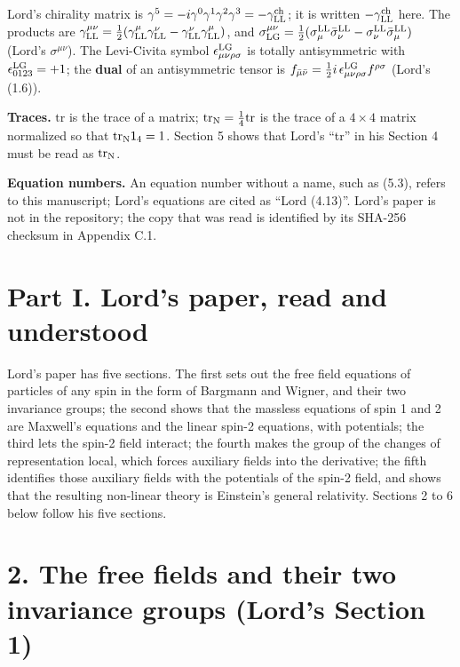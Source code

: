 \documentclass[
  10pt,
]{article}
\begin{document}
Lord's chirality matrix is
\(\gamma^5=-i\gamma^0\gamma^1\gamma^2\gamma^3=-\gamma^{\rm ch}_{\rm LL}\);
it is written \(-\gamma^{\rm ch}_{\rm LL}\) here. The products are
\(\gamma^{\mu\nu}_{\rm LL}=\tfrac12(\gamma^\mu_{\rm LL}\gamma^\nu_{\rm LL}-\gamma^\nu_{\rm LL}\gamma^\mu_{\rm LL})\),
and
\(\sigma^{\mu\nu}_{\rm LG}=\tfrac12(\sigma^{\rm LL}_\mu\bar\sigma^{\rm LL}_\nu-\sigma^{\rm LL}_\nu\bar\sigma^{\rm LL}_\mu)\)
(Lord's \(\sigma^{\mu\nu}\)). The Levi-Civita symbol
\(\epsilon^{\rm LG}_{\mu\nu\rho\sigma}\) is totally antisymmetric with
\(\epsilon^{\rm LG}_{0123}=+1\); the \textbf{dual} of an antisymmetric
tensor is
\(f_{\bar\mu\bar\nu}=\tfrac12i\,\epsilon^{\rm LG}_{\mu\nu\rho\sigma}f^{\rho\sigma}\)
(Lord's (1.6)).

\textbf{Traces.} \(\mathrm{tr}\) is the trace of a matrix;
\(\mathrm{tr}_{\rm N}=\tfrac14\mathrm{tr}\) is the trace of a
\(4\times4\) matrix normalized so that
\(\mathrm{tr}_{\rm N}\mathsf 1_4=1\). Section 5 shows that Lord's ``tr''
in his Section 4 must be read as \(\mathrm{tr}_{\rm N}\).

\textbf{Equation numbers.} An equation number without a name, such as
(5.3), refers to this manuscript; Lord's equations are cited as ``Lord
(4.13)''. Lord's paper is not in the repository; the copy that was read
is identified by its SHA-256 checksum in Appendix C.1.

\hypertarget{part-i.-lords-paper-read-and-understood}{%
\section{Part I. Lord's paper, read and
understood}\label{part-i.-lords-paper-read-and-understood}}

Lord's paper has five sections. The first sets out the free field
equations of particles of any spin in the form of Bargmann and Wigner,
and their two invariance groups; the second shows that the massless
equations of spin 1 and 2 are Maxwell's equations and the linear spin-2
equations, with potentials; the third lets the spin-2 field interact;
the fourth makes the group of the changes of representation local, which
forces auxiliary fields into the derivative; the fifth identifies those
auxiliary fields with the potentials of the spin-2 field, and shows that
the resulting non-linear theory is Einstein's general relativity.
Sections 2 to 6 below follow his five sections.

\hypertarget{the-free-fields-and-their-two-invariance-groups-lords-section-1}{%
\section{2. The free fields and their two invariance groups (Lord's
Section
1)}\label{the-free-fields-and-their-two-invariance-groups-lords-section-1}}
\end{document}
